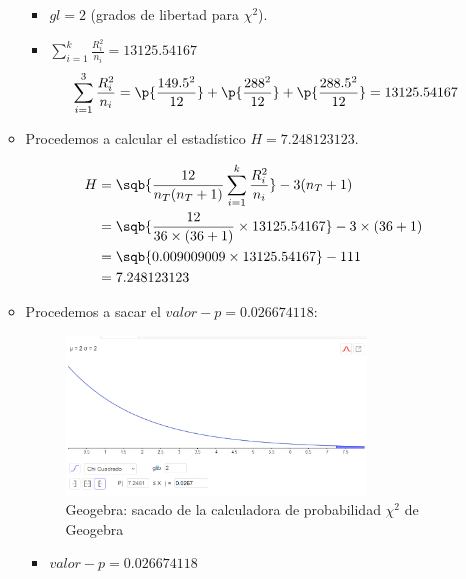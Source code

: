 \begin{enumerate}
\begin{itemize}
\begin{itemize}
                    \item $gl=2$ (grados de libertad para $\chi^2$). 
                    \item $\displaystyle \sum_{i=1}^{k}\frac{R^2_i}{n_i} = 13125.54167$
                        \[
                            \sum_{i=1}^{3} \frac{R^2_i}{n_i} = \p{\frac{149.5^2}{12}}  + \p{\frac{288^2}{12}}  + \p{\frac{288.5^2}{12}}  =  13125.54167 \\ 
                        \]
                \end{itemize}
            
            \item Procedemos a calcular el estadístico $H = 7.248123123$. 
                \begin{center}
                   \begin{align*}
                       H &= \sqb{\frac{12}{n_T(n_T+1)}\sum_{i=1}^{k}\frac{R^2_i}{n_i}} -3(n_T+1) \\ 
                       &= \sqb{\frac{12}{36 \times (36 + 1)}\times 13125.54167} -3\times(36 + 1) \\ 
                       &= \sqb{0.009009009 \times 13125.54167} -111 \\ 
                       &= 7.248123123 \\ 
                   \end{align*}
                \end{center}
            
            \item Procedemos a sacar el $valor-p = 0.026674118$:
                \begin{figure}[H]
                    \centering
                    \includegraphics[width=0.8\textwidth]{./appendages/valor-pKW.png}
                    \caption{Geogebra: sacado de la calculadora de probabilidad $\chi^2$ de Geogebra}
                \end{figure}
                \begin{itemize}
                    \item $valor-p= 0.026674118$
                \end{itemize}
        \end{itemize}
        

\end{enumerate}
